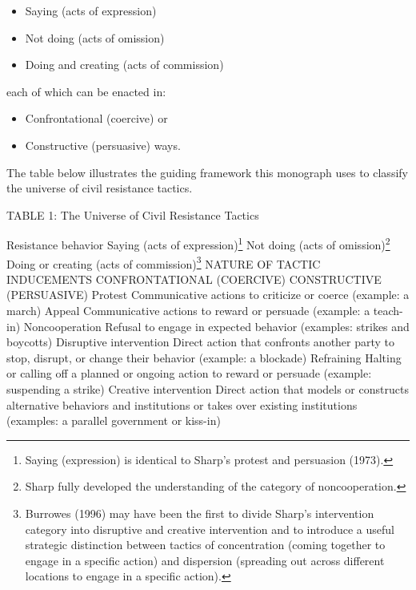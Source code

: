 \documentclass[twoside,a4paper,12pt,fleqn,openany]{extbook}
\begin{document}
\begin{itemize}
\item Saying (acts of expression)
\item Not doing (acts of omission)
\item Doing and creating (acts of commission)
\end{itemize}

each of which can be enacted in:

\begin{itemize}
\item Confrontational (coercive) or
\item Constructive (persuasive) ways.
\end{itemize}

The table below illustrates the guiding framework this monograph uses to classify the universe of civil resistance tactics.

TABLE 1: The Universe of Civil Resistance Tactics

Resistance behavior
Saying (acts of expression)\footnote{Saying (expression) is identical to Sharp’s protest and persuasion (1973).}
Not doing (acts of omission)\footnote{Sharp fully developed the understanding of the category of noncooperation.}
Doing or creating (acts of commission)\footnote{Burrowes (1996) may have been the first to divide Sharp’s intervention category into disruptive and creative intervention and to introduce a useful strategic distinction between tactics of concentration (coming together to engage in a specific action) and dispersion (spreading out across different locations to engage in a specific action).}
NATURE OF TACTIC INDUCEMENTS
CONFRONTATIONAL (COERCIVE)
CONSTRUCTIVE (PERSUASIVE)
Protest
Communicative actions to criticize or coerce (example: a march)
Appeal
Communicative actions to reward or persuade (example: a teach-in)
Noncooperation
Refusal to engage in expected behavior (examples: strikes and boycotts)
Disruptive intervention
Direct action that confronts another party to stop, disrupt, or change their behavior (example: a blockade)
Refraining
Halting or calling off a planned or ongoing action to reward or persuade (example: suspending a strike)
Creative intervention
Direct action that models or constructs alternative behaviors and institutions or takes over existing institutions (examples: a parallel government or kiss-in)
\end{document}
